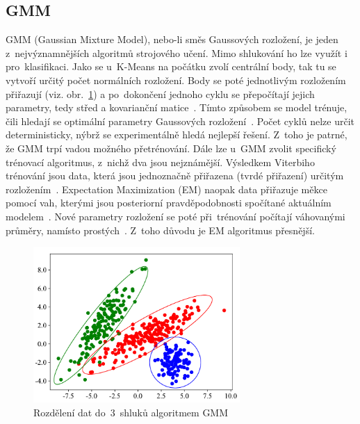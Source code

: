 \subsection{GMM}
GMM (Gaussian Mixture Model), nebo-li směs Gaussových rozložení, je jeden z~nejvýznamnějších algoritmů strojového učení. Mimo shlukování ho lze využít i pro~klasifikaci. Jako se u~K-Means na počátku zvolí centrální body, tak tu se vytvoří určitý počet normálních rozložení. Body se poté jednotlivým rozložením přiřazují (viz. obr.~\ref{gmm-img}) a po~dokončení jednoho cyklu se přepočítají jejich parametry, tedy střed a kovarianční matice~\cite{sur-gmm-lecture}. Tímto způsobem se model trénuje, čili hledají se optimální parametry Gaussových rozložení~\cite{sur-gmm-lecture}. Počet cyklů nelze určit deterministicky, nýbrž se experimentálně hledá nejlepší řešení. Z~toho je patrné, že GMM trpí vadou možného přetrénování. Dále lze u~GMM zvolit specifický trénovací algoritmus, z~nichž dva jsou nejznámější. Výsledkem Viterbiho trénování jsou data, která jsou jednoznačně přiřazena (tvrdé přiřazení) určitým rozložením~\cite{sur-gmm-lecture}. Expectation Maximization (EM) naopak data přiřazuje měkce pomocí vah, kterými jsou posteriorní pravděpodobnosti spočítané aktuálním modelem~\cite{sur-gmm-lecture}. Nové parametry rozložení se poté při~trénování počítají váhovanými průměry, namísto prostých~\cite{sur-gmm-lecture}. Z~toho důvodu je EM algoritmus přesnější.

\begin{figure}[hbt]
	\centering
	\includegraphics[width=0.7\textwidth]{obrazky/gmm.pdf}
	\caption{Rozdělení dat do~3~shluků algoritmem GMM}
	\label{gmm-img}
\end{figure}

